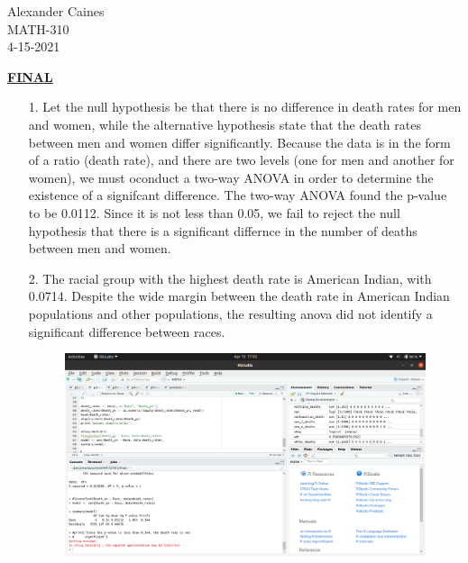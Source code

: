 \documentclass[12pt]{article}
\begin{document}
\vspace{1.0 \baselineskip}

\begin{flushright}
	Alexander Caines\\
	MATH-310\\
	4-15-2021\\
\end{flushright}

\begin{center}
	\textbf{\underline{FINAL}}
\end{center}



\begin{enumerate}
	\item[1.] Let the null hypothesis be that there is no difference in death rates for men and women, 
		while the alternative hypothesis state that the death rates between men and women differ significantly. 
		Because the data is in the form of a ratio (death rate), and there are two levels (one for men and another for women), 
		we must oconduct a two-way ANOVA in order to determine the existence of a signifcant difference. 
		The two-way ANOVA found the p-value to be 0.0112. Since it is not less than 0.05, we fail to reject
		 the null hypothesis that there is a significant differnce in the number of deaths between men and women. 
	\item[2.] The racial group with the highest death rate is American Indian, with 0.0714. Despite the wide margin 
		between the death rate in American Indian populations and other populations, the resulting anova did not 
	identify a significant difference between races.
	\begin{figure}[!h]
		\centering
		\includegraphics[width=\linewidth]{p2.png}

\end{figure}
\end{enumerate}
\end{document}
